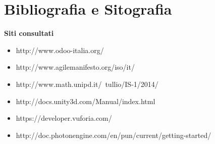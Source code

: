 
\section{Bibliografia e Sitografia}
\Large
\textbf{Siti consultati}
\normalsize
\begin{itemize}
	\item http://www.odoo-italia.org/
	\item http://www.agilemanifesto.org/iso/it/
	\item http://www.math.unipd.it/~tullio/IS-1/2014/
	\item http://docs.unity3d.com/Manual/index.html 
	\item https://developer.vuforia.com/
	\item http://doc.photonengine.com/en/pun/current/getting-started/
\end{itemize}
